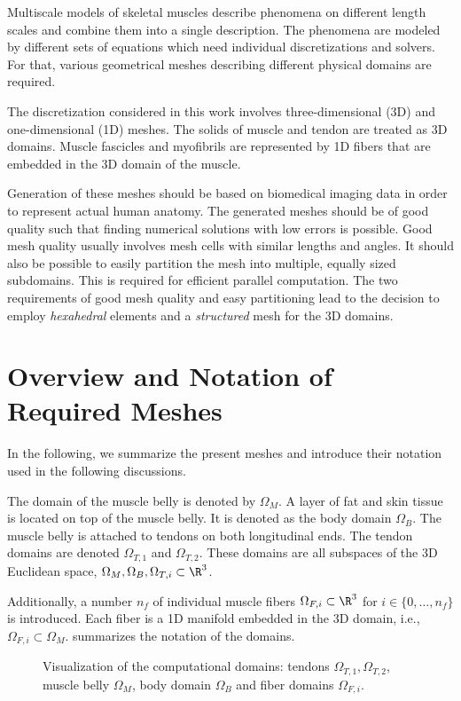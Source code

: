 
Multiscale models of skeletal muscles describe phenomena on different length scales and combine them into a single description. The phenomena are modeled by different sets of equations which need individual discretizations and solvers. For that, various geometrical meshes describing different physical domains are required.

The discretization considered in this work involves three-dimensional (3D) and one-dimensional (1D) meshes.
The solids of muscle and tendon are treated as 3D domains. Muscle fascicles and myofibrils are represented by 1D fibers that are embedded in the 3D domain of the muscle.

Generation of these meshes should be based on biomedical imaging data in order to represent actual human anatomy. The generated meshes should be of good quality such that finding numerical solutions with low errors is possible. Good mesh quality usually involves mesh cells with similar lengths and angles. It should also be possible to easily partition the mesh into multiple, equally sized subdomains. This is required for efficient parallel computation.
The two requirements of good mesh quality and easy partitioning lead to the decision to employ \emph{hexahedral} elements and a \emph{structured} mesh for the 3D domains.

\section{Overview and Notation of Required Meshes}
In the following, we summarize the present meshes and introduce their notation used in the following discussions.

The domain of the muscle belly is denoted by $\Omega_M$. A layer of fat and skin tissue is located on top of the muscle belly. It is denoted as the body domain $\Omega_B$.
The muscle belly is attached to tendons on both longitudinal ends. The tendon domains are denoted $\Omega_{T,1}$ and $\Omega_{T,2}$. These domains are all subspaces of the 3D Euclidean space, $\Omega_M,\Omega_B,\Omega_{T,i} \subset \R^3$.

Additionally, a number $n_f$ of individual muscle fibers $\Omega_{F,i} \subset \R^3$ for $i \in \{0,\dots,n_f\}$ is introduced. Each fiber is a 1D manifold embedded in the 3D domain, i.e., $\Omega_{F,i} \subset \Omega_M$.  summarizes the notation of the domains.

\begin{figure}%
    \centering%
    \def\svgwidth{8cm}%
    \caption{Visualization of the computational domains: tendons $\Omega_{T,1}, \Omega_{T,2}$, muscle belly $\Omega_M$, body domain $\Omega_B$ and fiber domains $\Omega_{F,i}$.}%
    \label{fig:fibers_domains}%
\end{figure}%

